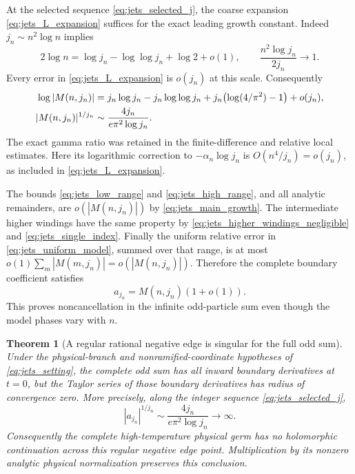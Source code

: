 \documentclass[11pt]{article}
\numberwithin{equation}{section}
\newtheorem{theorem}{Theorem}[section]
\theoremstyle{definition}
\begin{document}
At the selected sequence \eqref{eq:jets_selected_j}, the coarse
expansion \eqref{eq:jets_L_expansion} suffices for the exact leading
growth constant.  Indeed $j_n\sim n^2\log n$ implies
\[
 2\log n=\log j_n-\log\log j_n+\log2+o(1),\qquad
 \frac{n^2\log j_n}{2j_n}\longrightarrow1.
\]
Every error in \eqref{eq:jets_L_expansion} is $o(j_n)$ at this scale.
Consequently
\begin{align}
 \log|M(n,j_n)|
 &=j_n\log j_n-j_n\log\log j_n
   +j_n\bigl(\log(4/\pi^2)-1\bigr)+o(j_n),
 \label{eq:jets_main_growth}\\
 |M(n,j_n)|^{1/j_n}
 &\sim\frac{4j_n}{e\pi^2\log j_n}.
 \notag
\end{align}
The exact gamma ratio was retained in the finite-difference and
relative local estimates.  Here its logarithmic correction to
$-\alpha_n\log j_n$ is $O(n^4/j_n)=o(j_n)$, as included in
\eqref{eq:jets_L_expansion}.


The bounds \eqref{eq:jets_low_range} and
\eqref{eq:jets_high_range}, and all analytic remainders, are
$o(|M(n,j_n)|)$ by \eqref{eq:jets_main_growth}. The intermediate
higher windings have the same property by
\eqref{eq:jets_higher_windings_negligible} and
\eqref{eq:jets_single_index}. Finally the uniform relative error
in \eqref{eq:jets_uniform_model}, summed over that range, is at
most $o(1)\sum_m|M(m,j_n)|=o(|M(n,j_n)|)$. Therefore the
complete boundary coefficient satisfies
\begin{equation}\label{eq:jets_complete_noncancellation}
 a_{j_n}=M(n,j_n)(1+o(1)).
\end{equation}
This proves noncancellation in the infinite odd-particle sum even
though the model phases vary with $n$.

\begin{theorem}[A regular rational negative edge is singular for the full odd sum]
\label{thm:jets_negative_edge}
Under the physical-branch and nonramified-coordinate hypotheses
of \eqref{eq:jets_setting}, the complete odd sum has all inward
boundary derivatives at $t=0$, but the Taylor series of those
boundary derivatives has radius of convergence zero. More
precisely, along the integer sequence \eqref{eq:jets_selected_j},
\[
 |a_{j_n}|^{1/j_n}\sim\frac{4j_n}{e\pi^2\log j_n}\longrightarrow\infty.
\]
Consequently the complete high-temperature physical germ has no
holomorphic continuation across this regular negative edge
point. Multiplication by its nonzero analytic physical
normalization preserves this conclusion.
\end{theorem}
\end{document}

